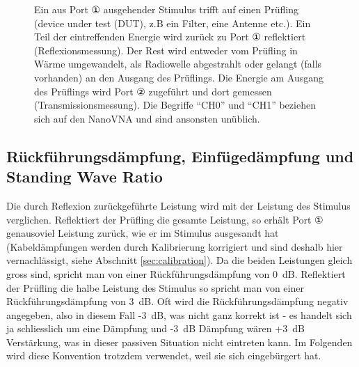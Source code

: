 \documentclass[twoside,a4paper,11pt,halfparskip,DIV=11,notitlepage]{scrartcl}
\begin{document}
\begin{figure}[H]
    \begin{center}
    \end{center}
    \caption{Ein aus Port ① ausgehender Stimulus trifft auf einen Prüfling (device under test (DUT), z.B
        ein Filter, eine Antenne etc.). Ein Teil der eintreffenden Energie wird zurück zu Port ① reflektiert
        (Reflexionsmessung). Der Rest wird entweder vom Prüfling in Wärme umgewandelt, als Radiowelle
        abgestrahlt oder gelangt (falls vorhanden) an den Ausgang des Prüflings. Die Energie am Ausgang
        des Prüflings wird Port ② zugeführt und dort gemessen (Transmissionsmessung). Die Begriffe ``CH0''
        und ``CH1'' beziehen sich auf den NanoVNA und sind ansonsten unüblich.}
    \label{fig:testset}
\end{figure}

\subsection{Rückführungsdämpfung, Einfügedämpfung und Standing Wave Ratio}

Die durch Reflexion zurückgeführte Leistung wird mit der Leistung des Stimulus verglichen. Reflektiert
der Prüfling die gesamte Leistung, so erhält Port ① genausoviel Leistung zurück, wie er im Stimulus
ausgesandt hat (Kabeldämpfungen werden durch Kalibrierung korrigiert und sind deshalb hier vernachlässigt,
siehe Abschnitt \ref{sec:calibration}). Da die beiden Leistungen gleich gross sind, spricht man von
einer Rückführungsdämpfung von 0~dB. Reflektiert der Prüfling die halbe Leistung des Stimulus so spricht
man von einer Rückführungsdämpfung von 3~dB. Oft wird die Rückführungsdämpfung negativ angegeben, also
in diesem Fall -3~dB, was nicht ganz korrekt ist - es handelt sich ja schliesslich um eine Dämpfung 
und -3~dB Dämpfung wären +3~dB Verstärkung, was in dieser passiven Situation nicht eintreten kann.
Im Folgenden wird diese Konvention trotzdem verwendet, weil sie sich eingebürgert hat.
\end{document}
